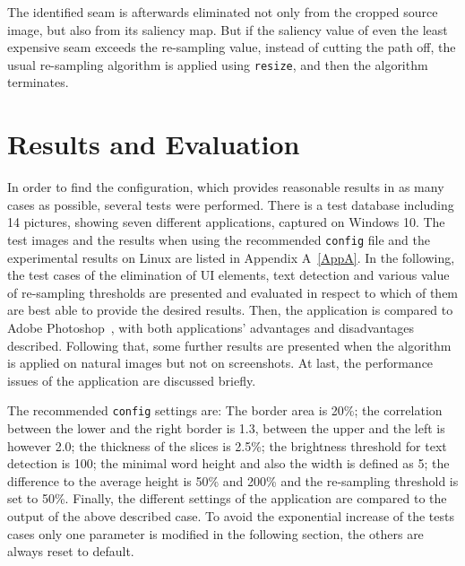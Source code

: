 \documentclass[draft,final]{vutinfth} %
\begin{document}
	The identified seam is afterwards eliminated not only from the cropped source image, but also from its saliency map.
	But if the saliency value of even the least expensive seam exceeds the re-sampling value, instead of cutting the path off, the usual re-sampling algorithm is applied using \texttt{resize}, and then the algorithm terminates. 
	
	\chapter{Results and Evaluation}
	In order to find the configuration, which provides reasonable results in as many cases as possible, several tests were performed.
	There is a test database including 14 pictures, showing seven different applications, captured on Windows 10.
	The test images and the results when using the recommended \texttt{config} file and the experimental results on Linux are listed in Appendix A~\ref{AppA}. 
	In the following, the test cases of the elimination of UI elements, text detection and various value of re-sampling thresholds are presented and evaluated in respect to which of them are best able to provide the desired results.
	Then, the application is compared to Adobe Photoshop~\cite{photoshop}, with both applications' advantages and disadvantages described.
	Following that, some further results are presented when the algorithm is applied on natural images but not on screenshots.
	At last, the performance issues of the application are discussed briefly.\par 
	The recommended \texttt{config} settings are:
	The border area is 20\%; the correlation between the lower and the right border is 1.3, between the upper and the left is however 2.0; the thickness of the slices is 2.5\%; the brightness threshold for text detection is 100; the minimal word height and also the width is defined as 5; the difference to the average height is 50\% and 200\% and the re-sampling threshold is set to 50\%.
	Finally, the different settings of the application are compared to the output of the above described case.
	To avoid the exponential increase of the tests cases only one parameter is modified in the following section, the others are always reset to default. 
\end{document}
